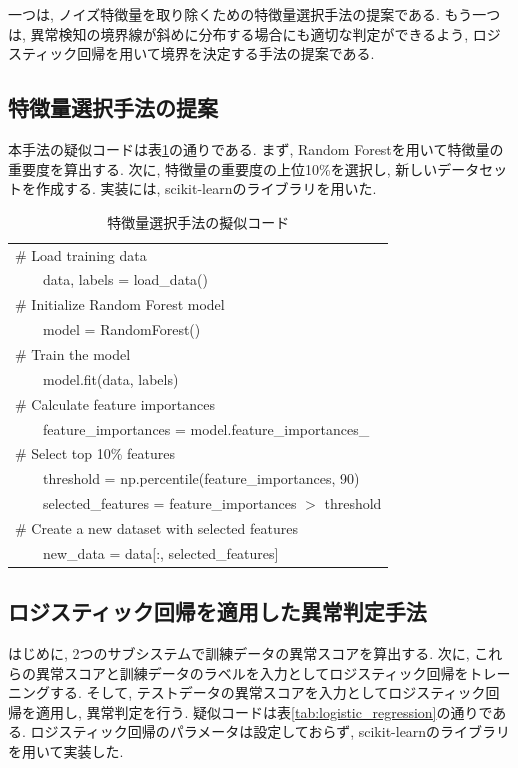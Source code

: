 \documentclass{css}
\begin{document}
一つは, ノイズ特徴量を取り除くための特徴量選択手法の提案である. もう一つは, 異常検知の境界線が斜めに分布する場合にも適切な判定ができるよう, ロジスティック回帰を用いて境界を決定する手法の提案である. 

\subsection{特徴量選択手法の提案}   
本手法の疑似コードは表\ref{tab:feature_selection}の通りである. まず, Random Forestを用いて特徴量の重要度を算出する. 次に, 特徴量の重要度の上位10\%を選択し, 新しいデータセットを作成する. 実装には, scikit-learnのライブラリを用いた\cite{scikit-learn}. 

\begin{table}[h!]
    \centering
    \caption{特徴量選択手法の擬似コード}
    \begin{tabular}{|l|}
    \hline
    \# Load training data \\
       \ \ \ \ data, labels = load\_data() \\ 
    \# Initialize Random Forest model \\
       \ \ \ \ model = RandomForest() \\ 
    \# Train the model \\
       \ \ \ \ model.fit(data, labels) \\ 
    \# Calculate feature importances \\
       \ \ \ \ feature\_importances = model.feature\_importances\_ \\ 
    \# Select top 10\% features \\
       \ \ \ \ threshold = np.percentile(feature\_importances, 90) \\
       \ \ \ \ selected\_features = feature\_importances $>$ threshold \\ 
    \# Create a new dataset with selected features \\
       \ \ \ \ new\_data = data[:, selected\_features] \\ \hline
    \end{tabular}
    \label{tab:feature_selection}
\end{table}


\subsection{ロジスティック回帰を適用した異常判定手法}
はじめに, 2つのサブシステムで訓練データの異常スコアを算出する. 次に, これらの異常スコアと訓練データのラベルを入力としてロジスティック回帰をトレーニングする. そして, テストデータの異常スコアを入力としてロジスティック回帰を適用し, 異常判定を行う. 疑似コードは表\ref{tab:logistic_regression}の通りである. ロジスティック回帰のパラメータは設定しておらず, scikit-learnのライブラリを用いて実装した. 
\end{document}
